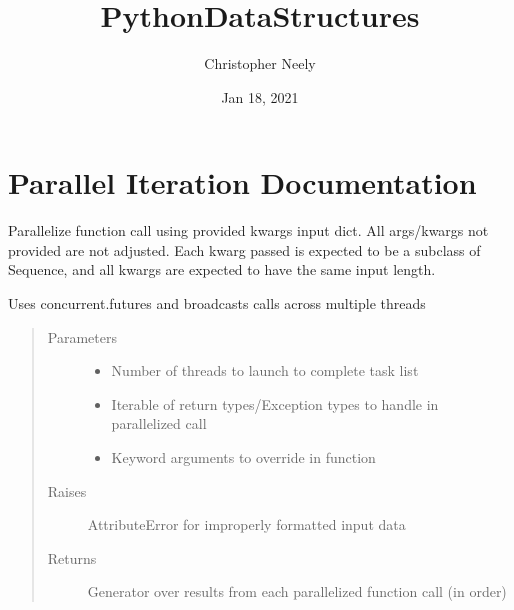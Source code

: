 \documentclass[letterpaper,10pt,english]{sphinxmanual}
\title{PythonDataStructures}
\date{Jan 18, 2021}
\author{Christopher Neely}
\begin{document}
\pagestyle{empty}
\sphinxmaketitle
\pagestyle{plain}
\sphinxtableofcontents
\pagestyle{normal}
\label{\detokenize{index::doc}}



\chapter{Parallel Iteration Documentation}
\label{\detokenize{api/parallel_iter:parallel-iteration-documentation}}\label{\detokenize{api/parallel_iter::doc}}

\begin{fulllineitems}
\label{\detokenize{api/parallel_iter:data_structures.parallel_iter.iter_threaded}}
Parallelize function call using provided kwargs input dict.
All args/kwargs not provided are not adjusted.
Each kwarg passed is expected to be a subclass of Sequence, and all kwargs are expected to have the
same input length.

Uses concurrent.futures and broadcasts calls across multiple threads
\begin{quote}\begin{description}
\item[{Parameters}] \leavevmode\begin{itemize}
\item {} 
 \textendash{} Number of threads to launch to complete task list

\item {} 
 \textendash{} Iterable of return types/Exception types to handle in parallelized call

\item {} 
 \textendash{} Keyword arguments to override in function

\end{itemize}

\item[{Raises}] \leavevmode
AttributeError for improperly formatted input data

\item[{Returns}] \leavevmode
Generator over results from each parallelized function call (in order)

\end{description}\end{quote}

\end{fulllineitems}
\end{document}
